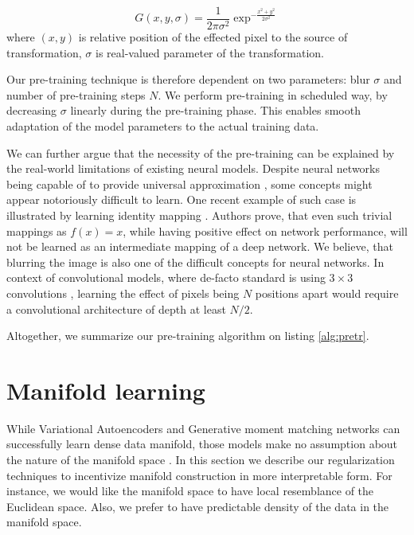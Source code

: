 \begin{equation}
  G(x, y, \sigma) = \frac{1}{2\pi\sigma^2}\exp^{-\frac{x^2+y^2}{2\sigma^2}}
\end{equation}
where $(x, y)$ is relative position of the effected pixel to the source of transformation, $\sigma$ is real-valued parameter of the transformation.

Our pre-training technique is therefore dependent on two parameters: blur $\sigma$ and number of pre-training steps $N$.
We perform pre-training in scheduled way, by decreasing $\sigma$ linearly during the pre-training phase.
This enables smooth adaptation of the model parameters to the actual training data.

We can further argue that the necessity of the pre-training can be explained by the real-world limitations of existing neural models.
Despite neural networks being capable of to provide universal approximation \cite{Debao1993}, some concepts might appear notoriously difficult to learn.
One recent example of such case is illustrated by learning identity mapping \cite{He2015}.
Authors prove, that even such trivial mappings as $f(x)=x$, while having positive effect on network performance, will not be learned as an intermediate mapping of a deep network.
We believe, that blurring the image is also one of the difficult concepts for neural networks.
In context of convolutional models, where de-facto standard is using $3 \times 3$ convolutions \cite{Szegedy2016a}, learning the effect of pixels being $N$ positions apart would require a convolutional architecture of depth at least $N/2$.

Altogether, we summarize our pre-training algorithm on listing \ref{alg:pretr}.



\section{Manifold learning}\label{ss:mf}

While Variational Autoencoders and Generative moment matching networks can successfully learn dense data manifold, those models make no assumption about the nature of the manifold space \cite{Li2015, Ren2016, Kingma2013}.
In this section we describe our regularization techniques to incentivize manifold construction in more interpretable form.
For instance, we would like the manifold space to have local resemblance of the Euclidean space.
Also, we prefer to have predictable density of the data in the manifold space.

